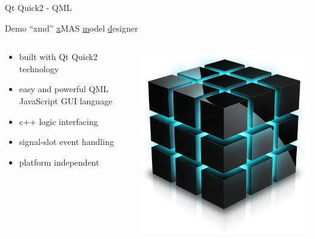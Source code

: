 \documentclass[11pt]{beamer}
\begin{document}
\begin{frame}{Qt Quick2 - QML} 
\end{frame}


\begin{frame}{Demo ``xmd'' \underline{x}MAS \underline{m}odel \underline{d}esigner}

	\begin{columns}
		\begin{column}[b]{0.8\textwidth}
			\begin{itemize}
				\item built with Qt Quick2 technology
				\item easy and powerful QML JavaScript GUI language
				\item c++ logic interfacing
				\item signal-slot event handling
				\item platform independent
			\end{itemize}			
		\end{column}
		\begin{column}[c]{.5\textwidth}
			\includegraphics[width=0.75\linewidth]{pictures/2a-xmd}
		\end{column}
	\end{columns}
		
\end{frame}
\end{document}
